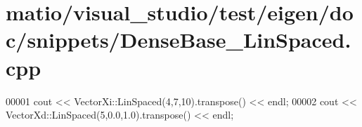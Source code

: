 \hypertarget{matio_2visual__studio_2test_2eigen_2doc_2snippets_2_dense_base___lin_spaced_8cpp_source}{}\section{matio/visual\+\_\+studio/test/eigen/doc/snippets/\+Dense\+Base\+\_\+\+Lin\+Spaced.cpp}
\label{matio_2visual__studio_2test_2eigen_2doc_2snippets_2_dense_base___lin_spaced_8cpp_source}

\begin{DoxyCode}
00001 cout << VectorXi::LinSpaced(4,7,10).transpose() << endl;
00002 cout << VectorXd::LinSpaced(5,0.0,1.0).transpose() << endl;
\end{DoxyCode}
